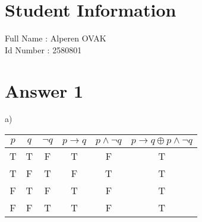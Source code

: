 \documentclass[12pt]{article}
\begin{document}
\section*{Student Information } 
Full Name :  Alperen OVAK\\
Id Number :  2580801\\

\section*{Answer 1}

\hspace{5mm} a)\\
\begin{table}[H]
\small
\centering
\begin{tabular}{|c|c|c|c|c|c|}
\hline
$p$ & $q$ & $\neg q$ & $p\rightarrow q$ & $ p\wedge \neg q$ & $ p\rightarrow q \oplus p\wedge \neg q $\\
\hline
T & T & F & T & F & T \\
T & F & T & F & T & T \\
F & T & F & T & F & T \\
F & F & T & T & F & T \\
\hline
\end{tabular}
\end{table}
\end{document}
